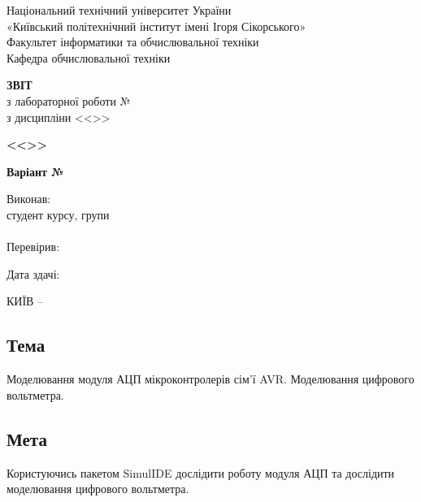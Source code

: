 \documentclass[14pt, a4paper]{extreport}
\begin{document}
	
	\begin{titlepage}
		\begin{center}
			\normalsize
			Національний технічний університет України\\
			«Київський політехнічний інститут імені Ігоря Сікорського» \\[0.5em]
			Факультет інформатики та обчислювальної техніки\\
			Кафедра обчислювальної техніки
			
			\vfill
			
			{\large \textbf{ЗВІТ}\\[0.5em]}
			{з лабораторної роботи №\LabNumber \\}
			{з дисципліни <<\CourseTitle>>}
			
			\vspace{2em}
			
			{\textbf{<<\Topic>>}}
			
			\vspace{1em}
			
			{\textbf{Варіант №\Variant}}
			
			\vfill
			
			\begin{flushright}
				Виконав: \\ студент \CourseNumber{} курсу, групи \StudentGroup \\
				\StudentName \\[1em]
				Перевірив: \\ \Teacher
			\end{flushright}
			
			\vfill
			
			\begin{flushright}
				Дата здачі: \DTMtoday
			\end{flushright}
			
			\vspace{5em}
			КИЇВ -- \ReportYear
		\end{center}
	\end{titlepage}
	
	\clearpage
	\setcounter{page}{2}
	
	\subsection*{Тема} 
	Моделювання модуля АЦП мікроконтролерів сім’ї AVR. Моделювання цифрового вольтметра.
	
	\subsection*{Мета} 
	Користуючись пакетом SimulIDE дослідити роботу модуля АЦП та дослідити моделювання цифрового вольтметра.
	
\end{document}
